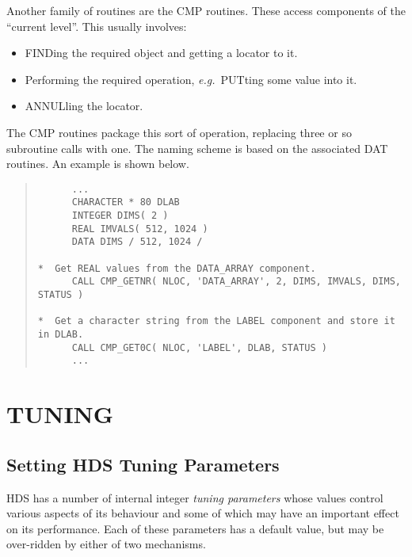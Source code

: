 \documentclass[twoside,11pt]{article}
\newcommand{\htmlref}[2]{#1}
\newcommand{\xlabel}[1]{}
\renewcommand{\_}{\texttt{\symbol{95}}}
\newcommand{\qt}[1]{``#1''}
\newcommand{\st}[1]{{\em{#1}}}
\newcommand{\qt}[1]{{\tt{"}}#1{\tt{"}}}
\begin{document}
Another family of routines are the \htmlref{CMP\_
routines}{appendix:cmproutines}. These access components of the
\qt{current level}. This usually involves:

\begin{itemize}

\item FINDing the required object and getting a \htmlref{locator}{sect:locators} to it.

\item Performing the required operation, \st{e.g.}\ PUTting some
value into it.

\item \htmlref{ANNULling}{sect:annul} the locator.

\end{itemize}

The CMP\_ routines package this sort of operation, replacing three or so
subroutine calls with one. The naming scheme is based on the
associated \htmlref{DAT\_ routines}{appendix:datroutines}. An example is
shown below.

\small
\begin{quote}
\begin{verbatim}
      ...
      CHARACTER * 80 DLAB
      INTEGER DIMS( 2 )
      REAL IMVALS( 512, 1024 )
      DATA DIMS / 512, 1024 /

*  Get REAL values from the DATA_ARRAY component.
      CALL CMP_GETNR( NLOC, 'DATA_ARRAY', 2, DIMS, IMVALS, DIMS, STATUS )

*  Get a character string from the LABEL component and store it in DLAB.
      CALL CMP_GET0C( NLOC, 'LABEL', DLAB, STATUS )
      ...
\end{verbatim}
\end{quote}
\normalsize

\section{\xlabel{tuning_HDS}\label{sect:tuning}TUNING}

\subsection{\xlabel{setting_HDS_tuning_parameters}Setting HDS Tuning Parameters}

HDS has a number of internal integer \st{tuning parameters} whose
values control various aspects of its behaviour and some of which may
have an important effect on its performance. Each of these parameters
has a default value, but may be over-ridden by either of two
mechanisms.
\end{document}
